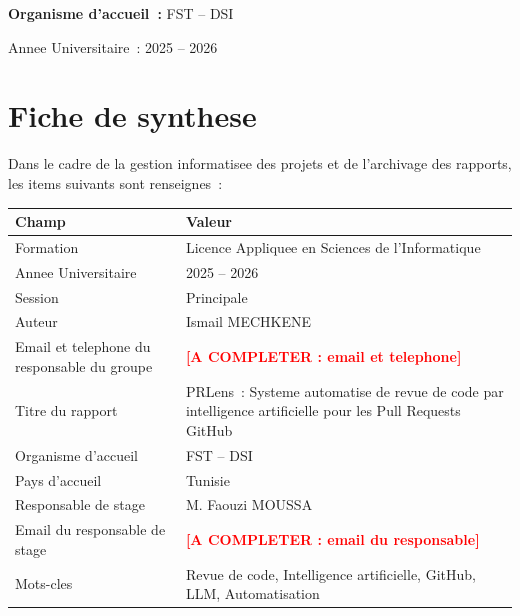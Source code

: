\documentclass[a4paper,12pt,oneside]{report}
\newcommand{\tablesetup}{\small\singlespacing\renewcommand{\arraystretch}{1.25}}
\newcommand{\todo}[1]{\textcolor{red}{\textbf{[A COMPLETER : #1]}}}
\begin{document}
\begin{titlepage}
\vspace{1.5cm}

\textbf{Organisme d'accueil~:} FST -- DSI

\vspace{2.5cm}

{\large Annee Universitaire~: 2025 -- 2026}

\end{titlepage}

\newpage
{}

\chapter*{Fiche de synthese}

Dans le cadre de la gestion informatisee des projets et de l'archivage des rapports, les items suivants sont renseignes~:

\begingroup
\tablesetup
\begin{longtable}{|L{4.8cm}|L{9.2cm}|}
\hline
{}
\textbf{Champ} & \textbf{Valeur} \\
\hline
Formation & Licence Appliquee en Sciences de l'Informatique \\
\hline
Annee Universitaire & 2025 -- 2026 \\
\hline
Session & Principale \\
\hline
Auteur & Ismail MECHKENE \\
\hline
Email et telephone du responsable du groupe & \todo{email et telephone} \\
\hline
Titre du rapport & PRLens~: Systeme automatise de revue de code par intelligence artificielle pour les Pull Requests GitHub \\
\hline
Organisme d'accueil & FST -- DSI \\
\hline
Pays d'accueil & Tunisie \\
\hline
Responsable de stage & M. Faouzi MOUSSA \\
\hline
Email du responsable de stage & \todo{email du responsable} \\
\hline
Mots-cles & Revue de code, Intelligence artificielle, GitHub, LLM, Automatisation \\
\hline
\end{longtable}
\endgroup
\end{document}
